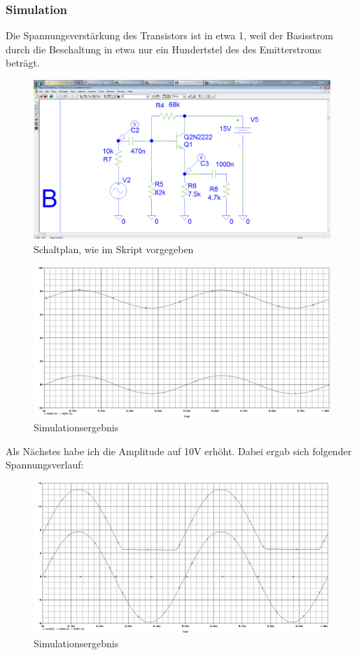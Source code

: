 \subsubsection*{Simulation}
Die Spannungsverstärkung des Transistors ist in etwa 1, weil der Basisstrom durch die Beschaltung in etwa nur ein Hundertstel des des Emitterstroms beträgt.\\
\begin{figure}[H]
	\centering
	\includegraphics[width=\linewidth]{versuch5/spice/s5221.png}
	\caption{Schaltplan, wie im Skript vorgegeben}
\end{figure}
\begin{figure}[H]
	\centering
	\includegraphics[width=\linewidth]{versuch5/spice/5221.png}
	\caption{Simulationsergebnis}
\end{figure}
Als Nächstes habe ich die Amplitude auf 10V erhöht. Dabei ergab sich folgender Spannungsverlauf:
\begin{figure}[H]
	\centering
	\includegraphics[width=\linewidth]{versuch5/spice/5222.png}
	\caption{Simulationsergebnis}
\end{figure}
